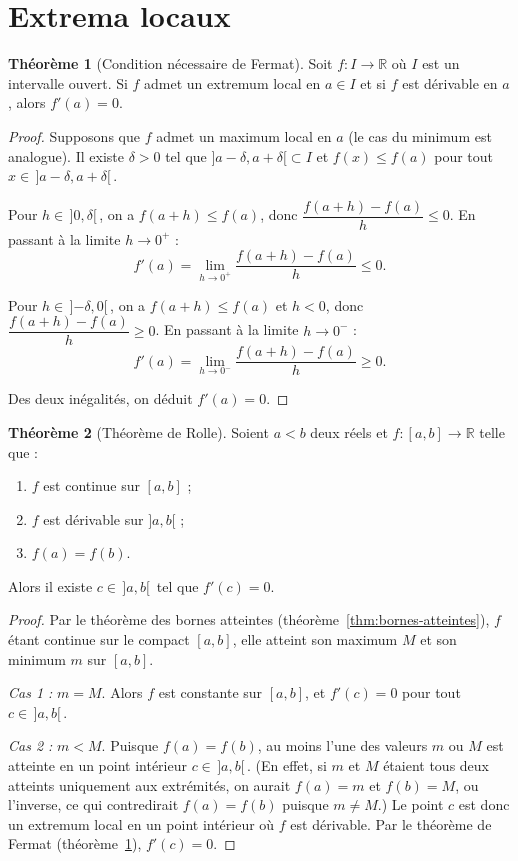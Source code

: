 \documentclass[12pt,a4paper,openany]{book}
\theoremstyle{definition}
\newtheorem{theoreme}{Théorème}[chapter]
\newcommand{\R}{\mathbb{R}}
\begin{document}
\section{Extrema locaux}\label{sec:extrema}

\begin{theoreme}[Condition nécessaire de Fermat]\label{thm:fermat}
Soit $f \colon I \to \R$ où $I$ est un intervalle ouvert. Si $f$ admet un extremum local en $a \in I$ et si $f$ est dérivable en $a$, alors $f'(a) = 0$.
\end{theoreme}

\begin{proof}
Supposons que $f$ admet un maximum local en $a$ (le cas du minimum est analogue). Il existe $\delta > 0$ tel que $]a - \delta, a + \delta[ \subset I$ et $f(x) \leqslant f(a)$ pour tout $x \in \,]a - \delta, a + \delta[\,$.

Pour $h \in \,]0, \delta[\,$, on a $f(a+h) \leqslant f(a)$, donc $\dfrac{f(a+h) - f(a)}{h} \leqslant 0$. En passant à la limite $h \to 0^+$ :
\[
  f'(a) = \lim_{h \to 0^+} \frac{f(a+h) - f(a)}{h} \leqslant 0.
\]

Pour $h \in \,]{-\delta}, 0[\,$, on a $f(a+h) \leqslant f(a)$ et $h < 0$, donc $\dfrac{f(a+h) - f(a)}{h} \geqslant 0$. En passant à la limite $h \to 0^-$ :
\[
  f'(a) = \lim_{h \to 0^-} \frac{f(a+h) - f(a)}{h} \geqslant 0.
\]

Des deux inégalités, on déduit $f'(a) = 0$.
\end{proof}

\begin{theoreme}[Théorème de Rolle]\label{thm:rolle}
Soient $a < b$ deux réels et $f \colon [a, b] \to \R$ telle que :
\begin{enumerate}[label=\textup{(\roman*)}]
  \item $f$ est continue sur $[a, b]$ ;
  \item $f$ est dérivable sur $]a, b[$ ;
  \item $f(a) = f(b)$.
\end{enumerate}
Alors il existe $c \in \,]a, b[\,$ tel que $f'(c) = 0$.
\end{theoreme}

\begin{proof}
Par le théorème des bornes atteintes (théorème~\ref{thm:bornes-atteintes}), $f$ étant continue sur le compact $[a, b]$, elle atteint son maximum $M$ et son minimum $m$ sur $[a, b]$.

\emph{Cas 1 :} $m = M$. Alors $f$ est constante sur $[a, b]$, et $f'(c) = 0$ pour tout $c \in \,]a, b[\,$.

\emph{Cas 2 :} $m < M$. Puisque $f(a) = f(b)$, au moins l'une des valeurs $m$ ou $M$ est atteinte en un point intérieur $c \in \,]a, b[\,$. (En effet, si $m$ et $M$ étaient tous deux atteints uniquement aux extrémités, on aurait $f(a) = m$ et $f(b) = M$, ou l'inverse, ce qui contredirait $f(a) = f(b)$ puisque $m \neq M$.) Le point $c$ est donc un extremum local en un point intérieur où $f$ est dérivable. Par le théorème de Fermat (théorème~\ref{thm:fermat}), $f'(c) = 0$.
\end{proof}
\end{document}
